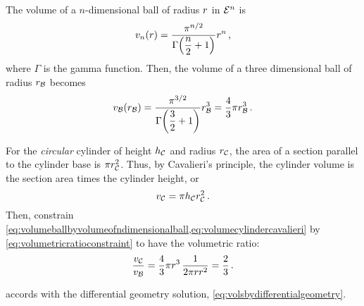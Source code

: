  The volume of a $n$-dimensional ball of radius $r$ in $\mathcal{E}^{n}$ is
%
\begin{equation*}
  \volume_{n}\vat{\radius} = \dfrac{\pi^{n/2}}{\Gamma\vat{\dfrac n2 + 1}}\radius^n\,,
\end{equation*}
%
where $\Gamma$ is the gamma function. Then, the volume of a three dimensional ball of radius $r_{\mathcal{B}}$ becomes
%
\begin{equation}\label{eq:volumeballbyvolumeofndimensionalball}
  \vball\vat\rball = \dfrac{\pi^{3/2}}{\Gamma\vat{\dfrac 32 + 1}}\rball^3
                   = \dfrac 43\pi\rball^3\,.
\end{equation}

 For the \emph{circular} cylinder of height $h_{\mathcal{C}}$ and radius $r_{\mathcal{C}}$, the area of a section parallel to the cylinder base is $\pi r_{\mathcal{C}}^2$. Thus, by Cavalieri's principle, the cylinder volume is the section area times the cylinder height, or
%
\begin{equation}\label{eq:volumecylindercavalieri}
  v_{\mathcal{C}} = \pi h_{\mathcal{C}}r_{\mathcal{C}}^2\,.
\end{equation}
%
Then, constrain \cref{eq:volumeballbyvolumeofndimensionalball,eq:volumecylindercavalieri} by \cref{eq:volumetricratioconstraint} to have the volumetric ratio:
%
\begin{equation}\label{eq:elegantsolution}
  \dfrac{v_{\mathcal{C}}}{v_{\mathcal{B}}} = \dfrac 43\pi r^3\,\dfrac{1}{2\pi rr^2}
                    = \dfrac 23\,.
\end{equation}

  accords with the differential geometry solution, \cref{eq:volsbydifferentialgeometry}.


